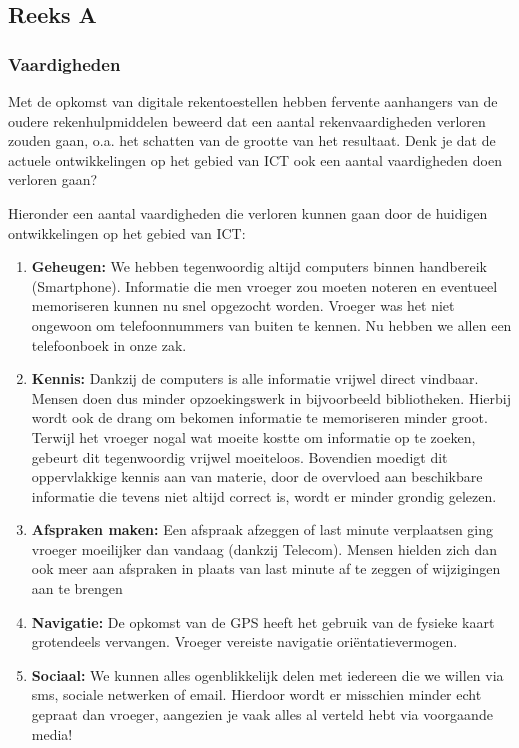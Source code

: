 \documentclass[../main.tex]{subfiles}
\begin{document}
\subsection{Reeks A}

\subsubsection{Vaardigheden}
\begin{question}Met de opkomst van digitale rekentoestellen hebben fervente aanhangers van de oudere rekenhulpmiddelen beweerd dat een aantal rekenvaardigheden verloren zouden gaan, o.a. het schatten van de grootte van het resultaat. Denk je dat de actuele ontwikkelingen op het gebied van ICT ook een aantal vaardigheden doen verloren gaan?
\end{question}

\begin{solution}
	Hieronder een aantal vaardigheden die verloren kunnen gaan door de huidigen ontwikkelingen op het gebied van ICT:
	\begin{enumerate}
		\item \textbf{Geheugen:} We hebben tegenwoordig altijd computers binnen handbereik (Smartphone). Informatie die men vroeger zou moeten noteren en eventueel memoriseren kunnen nu snel opgezocht worden. Vroeger was het niet ongewoon 
		om telefoonnummers van buiten te kennen. Nu hebben we allen een telefoonboek in onze zak.
		\item \textbf{Kennis:} Dankzij de computers is alle informatie vrijwel direct vindbaar. Mensen doen dus minder opzoekingswerk in bijvoorbeeld bibliotheken. Hierbij wordt ook de drang om bekomen informatie te memoriseren minder groot.
		Terwijl het vroeger nogal wat moeite kostte om informatie op te zoeken, gebeurt dit tegenwoordig vrijwel moeiteloos. Bovendien moedigt dit oppervlakkige kennis aan van materie, door de overvloed aan beschikbare informatie die tevens niet altijd correct is, wordt er minder grondig gelezen.
		\item \textbf{Afspraken maken:} Een afspraak afzeggen of last minute verplaatsen ging vroeger moeilijker dan vandaag (dankzij Telecom). Mensen hielden zich dan ook meer aan afspraken in plaats van last minute af te zeggen of wijzigingen aan te brengen
		\item \textbf{Navigatie:} De opkomst van de GPS heeft het gebruik van de fysieke kaart grotendeels vervangen. Vroeger vereiste navigatie ori\"entatievermogen.
		\item \textbf{Sociaal:} We kunnen alles ogenblikkelijk delen met iedereen die we willen via sms, sociale netwerken of email. Hierdoor wordt er misschien minder echt gepraat dan vroeger, aangezien je vaak alles al verteld hebt via voorgaande media!

	\end{enumerate}
\end{solution}
\end{document}
